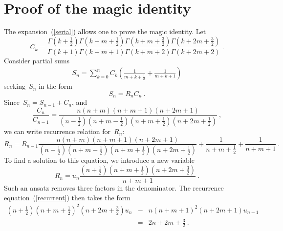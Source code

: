\documentclass[preprint,aps,prb]{revtex4}
\begin{document}
\section{Proof of the magic identity}
\label{sec:magic}
The expansion~(\ref{serial}) allows one to prove the magic identity.
Let
\begin{equation}
C_k = 
\frac{\Gamma\left(k + \frac{1}{2}\right) \Gamma\left(k + m + \frac{1}{2}\right)
      \Gamma\left(k + m + \frac{3}{2}\right) 
      \Gamma\left(k + 2m + \frac{3}{2}\right)
}{
\Gamma\left(k + 1\right) \Gamma\left(k + m + 1\right)
      \Gamma\left(k + m + 2\right) \Gamma\left(k + 2m + 2\right)
} 
\ .
\end{equation}
Consider  partial sums
\begin{eqnarray}
S_n = 
\sum\limits_{k = 0}^{n}
C_k
\left( \frac{1}{m + k + \frac{1}{2}} + \frac{1}{m + k + 1}   \right)
\end{eqnarray}
seeking~$S_n$ in the form
\begin{equation}
\label{r-ansatz}
S_n = R_n C_n
\ .
\end{equation}
Since~$S_n = S_{n - 1} + C_n$, and
\begin{equation}
\frac{C_n}{C_{n - 1}} = \frac{n (n + m) (n + m + 1) (n + 2m + 1)}{
\left(n - \frac{1}{2}\right)
\left(n + m - \frac{1}{2}\right)
\left(n + m + \frac{1}{2}\right)
\left(n + 2m + \frac{1}{2}\right)
}
\ , 
\end{equation} 
we can write recurrence relation for~$R_n$:
\begin{equation}
\label{recurrent}
R_n = R_{n - 1} \frac{n (n + m) (n + m + 1) (n + 2m + 1)}{
\left(n - \frac{1}{2}\right)
\left(n + m - \frac{1}{2}\right)
\left(n + m + \frac{1}{2}\right)
\left(n + 2m + \frac{1}{2}\right)
} + 
\frac{1}{n + m + \frac{1}{2}} + \frac{1}{n + m + 1}
\ .
\end{equation}
To find a solution to this equation, we introduce a new 
variable 
\begin{equation}
\label{u-ansatz}
R_n = u_n \frac{\left(n + \frac{1}{2}\right)
\left(n + m + \frac{1}{2}\right)
\left(n + 2 m + \frac{3}{2}\right)
}{n + m + 1}
\ .
\end{equation}
Such an ansatz removes three factors in the denominator.
The recurrence equation~(\ref{recurrent}) then takes the form
\begin{eqnarray}
\label{recurrent-u}
\left(n + \frac{1}{2}\right)
\left(n + m + \frac{1}{2}\right)^2
\left(n + 2 m + \frac{3}{2}\right) u_n
&-& 
n 
\left(n + m + 1\right)^2
\left(n + 2 m + 1\right) 
u_{n - 1}
\nonumber
\\
&=& 2n + 2m + \frac{3}{2}
\ .
\end{eqnarray}
\end{document}
